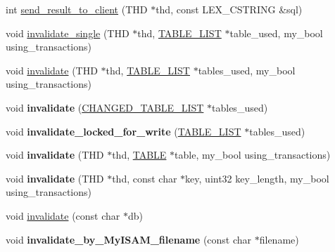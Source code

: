 \begin{DoxyCompactItemize}
int \mbox{\hyperlink{classQuery__cache_a8af9f720ae6120e8eed290f6f255e5bc}{send\+\_\+result\+\_\+to\+\_\+client}} (T\+HD $\ast$thd, const L\+E\+X\+\_\+\+C\+S\+T\+R\+I\+NG \&sql)
\item 
void \mbox{\hyperlink{classQuery__cache_ab13c2d43f8c1ff95146328a543feb7dc}{invalidate\+\_\+single}} (T\+HD $\ast$thd, \mbox{\hyperlink{structTABLE__LIST}{T\+A\+B\+L\+E\+\_\+\+L\+I\+ST}} $\ast$table\+\_\+used, my\+\_\+bool using\+\_\+transactions)
\item 
void \mbox{\hyperlink{classQuery__cache_ab334e040975e65b11bcb63cee0c85006}{invalidate}} (T\+HD $\ast$thd, \mbox{\hyperlink{structTABLE__LIST}{T\+A\+B\+L\+E\+\_\+\+L\+I\+ST}} $\ast$tables\+\_\+used, my\+\_\+bool using\+\_\+transactions)
\item 
\mbox{\label{classQuery__cache_a506bb96141d4090d8837abe53f4e7bee}} 
void {\bfseries invalidate} (\mbox{\hyperlink{structst__changed__table__list}{C\+H\+A\+N\+G\+E\+D\+\_\+\+T\+A\+B\+L\+E\+\_\+\+L\+I\+ST}} $\ast$tables\+\_\+used)
\item 
\mbox{\label{classQuery__cache_a037be6321714caca056fbf35e26bc9bb}} 
void {\bfseries invalidate\+\_\+locked\+\_\+for\+\_\+write} (\mbox{\hyperlink{structTABLE__LIST}{T\+A\+B\+L\+E\+\_\+\+L\+I\+ST}} $\ast$tables\+\_\+used)
\item 
\mbox{\label{classQuery__cache_ae54d3b365c00937756904914a32e2f09}} 
void {\bfseries invalidate} (T\+HD $\ast$thd, \mbox{\hyperlink{structTABLE}{T\+A\+B\+LE}} $\ast$table, my\+\_\+bool using\+\_\+transactions)
\item 
\mbox{\label{classQuery__cache_a5ab7055f9ca91513d3c2d95336c16386}} 
void {\bfseries invalidate} (T\+HD $\ast$thd, const char $\ast$key, uint32 key\+\_\+length, my\+\_\+bool using\+\_\+transactions)
\item 
void \mbox{\hyperlink{classQuery__cache_ab3da39c0186987975866d23bc98006bf}{invalidate}} (const char $\ast$db)
\item 
\mbox{\label{classQuery__cache_ac2fb18a2ba5e523f723cfa578cd26f35}} 
void {\bfseries invalidate\+\_\+by\+\_\+\+My\+I\+S\+A\+M\+\_\+filename} (const char $\ast$filename)
\item 
\mbox{\label{classQuery__cache_ad75f17c7084a777703961310a899175a}} 

\end{DoxyCompactItemize}
